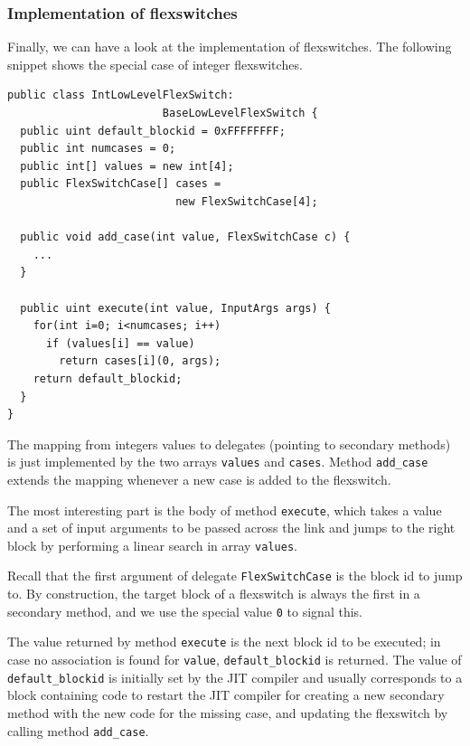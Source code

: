 \subsubsection{Implementation of flexswitches}
Finally, we can have a look at the implementation of flexswitches.
The following snippet shows the special case of integer flexswitches.
\begin{small}
\begin{lstlisting}[language={[Sharp]C}] 
public class IntLowLevelFlexSwitch: 
                        BaseLowLevelFlexSwitch {
  public uint default_blockid = 0xFFFFFFFF;
  public int numcases = 0;
  public int[] values = new int[4];
  public FlexSwitchCase[] cases = 
                          new FlexSwitchCase[4];

  public void add_case(int value, FlexSwitchCase c) {
    ...
  }

  public uint execute(int value, InputArgs args) {
    for(int i=0; i<numcases; i++)
      if (values[i] == value)
        return cases[i](0, args);
    return default_blockid;
  }
}
\end{lstlisting}
\end{small}
The mapping from integers values to delegates (pointing to secondary
methods) is just implemented by the two arrays \lstinline{values} and
\lstinline{cases}. Method \lstinline{add_case} extends the mapping
whenever a new case is added to the flexswitch.
  
The most interesting part is the body of method \lstinline{execute},
which takes a value and a set of input arguments to be passed across
the link and jumps to the right block by performing a linear search in
array \lstinline{values}.

Recall that the first argument of delegate \lstinline{FlexSwitchCase} is the
block id to jump to. By construction, the target block of a flexswitch is
always the first in a secondary method, and we use the special value
\lstinline{0} to signal this.

The value returned by method \lstinline{execute} is the next block id
to be executed; 
in case no association is found for \lstinline{value},
\lstinline{default_blockid} is returned. The value of
\lstinline{default_blockid} is initially set by the JIT compiler and
usually corresponds to a block containing code to restart the JIT
compiler for creating a new secondary method with the new code for the
missing case, and updating the flexswitch by calling method
\lstinline{add_case}.


